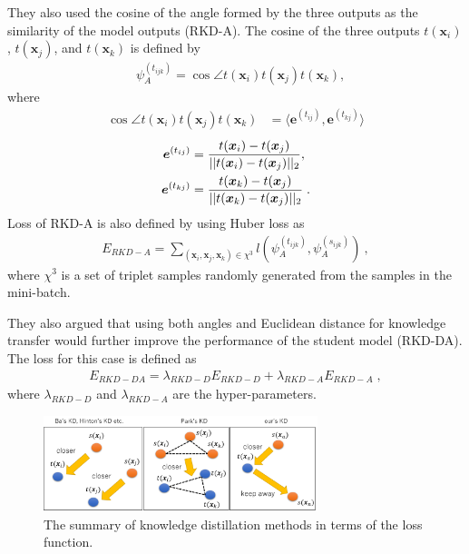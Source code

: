 \documentclass[a4paper,12pt]{article}
\begin{document}
They also used the cosine of the angle formed by the three outputs as the similarity of the model outputs (RKD-A).
The cosine of the three outputs $t(\bm{x}_i)$, $t(\bm{x}_j)$, and  $t(\bm{x}_k)$ is defined by
\begin{align} \label{eq:psiA}
    &\psi_A^{(t_{ijk})} = \cos \angle t(\bm{x}_i) t(\bm{x}_j) t(\bm{x}_k),
\end{align}
where
\begin{align} \label{eq:psiA-cos}
 \cos \angle t(\bm{x}_i) t(\bm{x}_j) t(\bm{x}_k) &= \langle \bm{e}^{(t_{ij})}, \bm{e}^{(t_{kj})} \rangle
\end{align}
\begin{align}
    \bm{e}^{(t_{ij})} &= \frac{t(\bm{x}_i) - t(\bm{x}_j)}{||t(\bm{x}_i) - t(\bm{x}_j)||_2}, \notag \\ \bm{e}^{(t_{kj})} &= \frac{t(\bm{x}_k) - t(\bm{x}_j)}{||t(\bm{x}_k) - t(\bm{x}_j)||_2} \; .
\end{align}
Loss of RKD-A is also defined by using Huber loss \cite{Huber1992} as
\begin{align} \label{eq:RKD-Aloss}
E_{RKD-A} = \sum_{(\bm{x}_i, \bm{x}_j, \bm{x}_k) \in \chi^3}l(\psi_A^{(t_{ijk})}, \psi_A^{(s_{ijk})}) \: ,
\end{align}
where $\chi^3$ is a set of triplet samples randomly generated from the samples in the mini-batch.

They also argued that using both angles and Euclidean distance for knowledge transfer would further improve the performance of the student model (RKD-DA).
The loss for this case is defined as
\begin{align} \label{eq:RKD-DAloss}
E_{RKD-DA} = \lambda_{RKD-D} E_{RKD-D} + \lambda_{RKD-A} E_{RKD-A} \; ,
\end{align}
where $\lambda_{RKD-D}$ and $\lambda_{RKD-A}$ are the hyper-parameters.

\begin{figure}[ht]
\begin{center}
\includegraphics[width=80mm]{figure_structure.png}
\caption{The summary of knowledge distillation methods in terms of the loss function.}
\label{fig:loss}
\end{center}
\end{figure}
\end{document}
